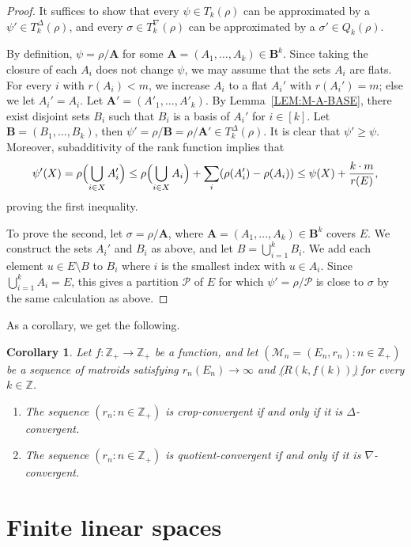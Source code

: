 \documentclass[10pt]{article}
\theoremstyle{plain}
\newtheorem{cor}[thm]{Corollary}
\theoremstyle{definition}
\newcommand{\bA}{\mathbf{A}}
\newcommand{\bB}{\mathbf{B}}
\newcommand{\bbZ}{\mathbb{Z}}
\newcommand{\MM}{\mathcal{M}}
\newcommand{\cP}{\mathcal{P}}
\begin{document}
\begin{proof}
It suffices to show that every $\psi\in T_k(\rho)$ can be approximated by a $\psi'\in T_k^\Delta(\rho)$, and every $\sigma\in T_k^\nabla(\rho)$ can be approximated by a $\sigma'\in Q_k(\rho)$.

By definition, $\psi=\rho/ \bA$ for some $\bA=(A_1,\dots,A_k)\in  \bB^k$. Since taking the closure of each $A_i$ does not change $\psi$, we may assume that the sets $A_i$ are flats. For every $i$ with $r(A_i)<m$, we increase $A_i$ to a
flat $A_i'$ with $r(A_i')=m$; else we let $A_i'=A_i$. Let
$ \bA'=(A'_1,\dots,A'_k)$. By Lemma~\ref{LEM:M-A-BASE}, there exist disjoint sets
$B_i$ such that $B_i$ is a basis of $A_i'$ for $i\in[k]$. Let
$ \bB=(B_1,\dots,B_k)$, then $\psi'=\rho/ \bB=\rho/ \bA'\in T_k^\Delta(\rho)$. It
is clear that $\psi'\ge\psi$. Moreover, subadditivity of the rank function
implies that
\[
\psi'(X)=\rho\Bigl(\bigcup_{i\in X} A'_i\Bigr)\le \rho\Bigl(\bigcup_{i\in X} A_i\Bigr) + \sum_i(\rho(A_i')-\rho(A_i))
\le \psi(X)+\frac{k\cdot m}{r(E)},
\]
proving the first inequality.

To prove the second, let $\sigma=\rho/ \bA$, where $ \bA=(A_1,\dots,A_k)\in \bB^k$
covers $E$. We construct the sets $A_i'$ and $B_i$ as above, and let $B=\bigcup_{i=1}^{k}
B_i$. We add each element $u\in E\setminus B$ to $B_i$ where $i$ is the smallest index
with $u\in A_i$. Since $\bigcup_{i=1}^{k}A_i=E$, this gives a partition $\cP$ of $E$ for which $\psi'=\rho/\cP$ is close to $\sigma$ by the same calculation as
above.
\end{proof}

As a corollary, we get the following.

\begin{cor}\label{COR:MISC-CONVERGE}
Let $f\colon\bbZ_+\to\bbZ_+$ be a function, and let $(\MM_n=(E_n,r_n)\colon n\in\bbZ_+)$ be a
sequence of matroids satisfying $r_n(E_n)\to \infty$ and \hyperlink{rkm}{($R(k,f(k))$)} for every $k\in\bbZ$.
\begin{enumerate}[label=(\alph*)]\itemsep0em
    \item The sequence $(r_n\colon n\in\bbZ_+)$ is crop-convergent if and only if it is $\Delta$-convergent.
    \item The sequence $(r_n\colon n\in\bbZ_+)$ is quotient-convergent if and only if it is $\nabla$-convergent.
\end{enumerate}
\end{cor}

\section{Finite linear spaces}
\label{sec:linear}
\end{document}
